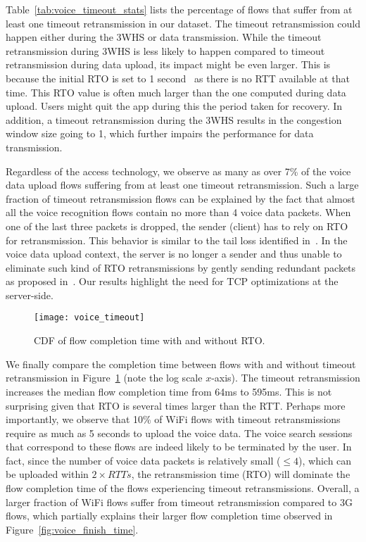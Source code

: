 Table~\ref{tab:voice_timeout_stats} lists the percentage of flows that suffer from at least one timeout retransmission in our dataset. The timeout retransmission could happen either during the 3WHS or data transmission. While the timeout retransmission during 3WHS is less likely to happen compared to timeout retransmission during data upload, its impact might be even larger. This is because the initial RTO is set to 1 second~\cite{rfc62982011computing} as there is no RTT available at that time. This RTO value is often much larger than the one computed during data upload. Users might quit the app during this the period taken for recovery. In addition, a timeout retransmission during the 3WHS results in the congestion window size going to 1, which further impairs the performance for data transmission.

Regardless of the access technology, we observe as many as over 7\% of the voice data upload flows suffering from at least one timeout retransmission. Such a large fraction of timeout retransmission flows can be explained by the fact that almost all the voice recognition flows contain no more than 4 voice data packets. When one of the last three packets is dropped, the sender (\ie client) has to rely on RTO for retransmission. This behavior is similar to the tail loss identified in~\cite{flach2013reducing}. In the voice data upload context, the server is no longer a sender and thus unable to eliminate such kind of RTO retransmissions by gently sending redundant packets as proposed in~\cite{flach2013reducing}. Our results highlight the need for TCP optimizations at the server-side. 

\begin{figure}[th]
\centering
	\texttt{[image: voice\_timeout]}
\caption{CDF of flow completion time with and without RTO.}
\label{fig:voice_rto}
\end{figure}

We finally compare the completion time between flows with and without timeout retransmission in Figure~\ref{fig:voice_rto} (note the log scale $x$-axis). The timeout retransmission increases the median flow completion time from 64ms to 595ms.  This is not surprising given that RTO is several times larger than the RTT. Perhaps more importantly, we observe that 10\% of WiFi flows with timeout retransmissions require as much as 5 seconds to upload the voice data. The voice search sessions that correspond to these flows are indeed likely to be terminated by the user. In fact, since the number of voice data packets is relatively small ($\le 4$), which can be uploaded within $2\times RTTs$, the retransmission time (\ie RTO) will dominate the flow completion time of the flows experiencing timeout retransmissions.  Overall, a larger fraction of WiFi flows suffer from timeout retransmission compared to 3G flows, which partially explains their larger flow completion time observed in Figure~\ref{fig:voice_finish_time}.

